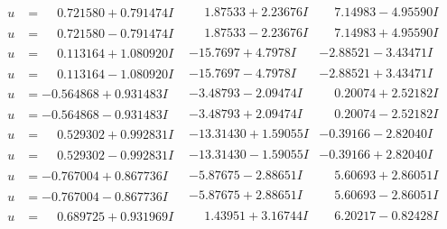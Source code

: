 \documentclass[1p]{elsarticle_modified}
\theoremstyle{definition}
\begin{document}
$$\begin{array}{c|c|c}
\begin{aligned}
u &= \phantom{-}0.721580 + 0.791474 I\end{aligned}
 & \phantom{-}1.87533 + 2.23676 I & \phantom{-}7.14983 - 4.95590 I \\ \hline\begin{aligned}
u &= \phantom{-}0.721580 - 0.791474 I\end{aligned}
 & \phantom{-}1.87533 - 2.23676 I & \phantom{-}7.14983 + 4.95590 I \\ \hline\begin{aligned}
u &= \phantom{-}0.113164 + 1.080920 I\end{aligned}
 & -15.7697 + 4.7978 I & -2.88521 - 3.43471 I \\ \hline\begin{aligned}
u &= \phantom{-}0.113164 - 1.080920 I\end{aligned}
 & -15.7697 - 4.7978 I & -2.88521 + 3.43471 I \\ \hline\begin{aligned}
u &= -0.564868 + 0.931483 I\end{aligned}
 & -3.48793 - 2.09474 I & \phantom{-}0.20074 + 2.52182 I \\ \hline\begin{aligned}
u &= -0.564868 - 0.931483 I\end{aligned}
 & -3.48793 + 2.09474 I & \phantom{-}0.20074 - 2.52182 I \\ \hline\begin{aligned}
u &= \phantom{-}0.529302 + 0.992831 I\end{aligned}
 & -13.31430 + 1.59055 I & -0.39166 - 2.82040 I \\ \hline\begin{aligned}
u &= \phantom{-}0.529302 - 0.992831 I\end{aligned}
 & -13.31430 - 1.59055 I & -0.39166 + 2.82040 I \\ \hline\begin{aligned}
u &= -0.767004 + 0.867736 I\end{aligned}
 & -5.87675 - 2.88651 I & \phantom{-}5.60693 + 2.86051 I \\ \hline\begin{aligned}
u &= -0.767004 - 0.867736 I\end{aligned}
 & -5.87675 + 2.88651 I & \phantom{-}5.60693 - 2.86051 I \\ \hline\begin{aligned}
u &= \phantom{-}0.689725 + 0.931969 I\end{aligned}
 & \phantom{-}1.43951 + 3.16744 I & \phantom{-}6.20217 - 0.82428 I \\ \hline\begin{aligned}

\end{aligned}
\end{array}$$
\end{document}
